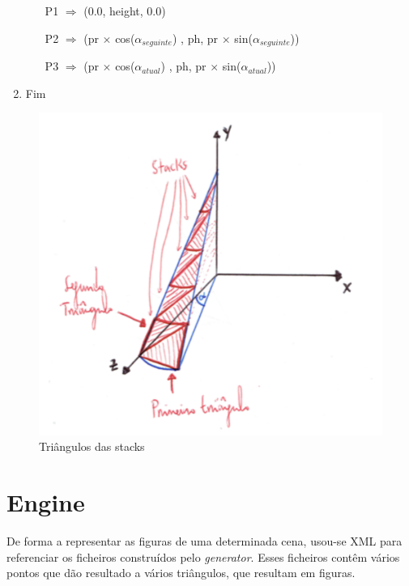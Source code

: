 \documentclass[a4paper]{article}
\begin{document}
\begin{enumerate}
\begin{enumerate}
        \hspace{3cm} P1 $\Rightarrow$ (0.0, height, 0.0)

    \vspace{0.2cm}

        \hspace{0.5cm} P2 $\Rightarrow$ (pr $\times$ cos($\alpha_{seguinte}$) , ph, pr $\times$ sin($\alpha_{seguinte}$))

    \vspace{0.2cm}

        \hspace{1cm} P3 $\Rightarrow$ (pr $\times$ cos($\alpha_{atual}$) , ph, pr $\times$ sin($\alpha_{atual}$))

    \vspace{0.3cm}

  \end{enumerate}

  \item Fim
\end{enumerate}
\rmfamily

\begin{figure}[H]
\centering
\includegraphics[scale=0.50]{cone_triangulos.png}
\caption{Triângulos das stacks}
\label{img:cone_triangulos}
\end{figure}

\newpage

\section{Engine}
\label{sec:engine}
De forma a representar as figuras de uma determinada cena, usou-se XML para referenciar os ficheiros construídos pelo \emph{generator}. Esses ficheiros contêm vários pontos que dão resultado a vários triângulos, que resultam em figuras.
\end{document}
